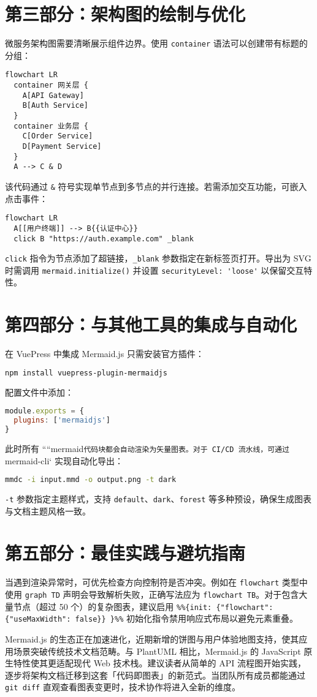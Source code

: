 \chapter{第三部分：架构图的绘制与优化}
微服务架构图需要清晰展示组件边界。使用 \verb!container! 语法可以创建带有标题的分组：\par
\begin{lstlisting}[language=mermaid]
flowchart LR
  container 网关层 {
    A[API Gateway]
    B[Auth Service]
  }
  container 业务层 {
    C[Order Service]
    D[Payment Service]
  }
  A --> C & D
\end{lstlisting}
该代码通过 \verb!&! 符号实现单节点到多节点的并行连接。若需添加交互功能，可嵌入点击事件：\par
\begin{lstlisting}[language=mermaid]
flowchart LR
  A[[用户终端]] --> B{{认证中心}}
  click B "https://auth.example.com" _blank
\end{lstlisting}
\verb!click! 指令为节点添加了超链接，\verb!_blank! 参数指定在新标签页打开。导出为 SVG 时需调用 \verb!mermaid.initialize()! 并设置 \verb!securityLevel: 'loose'! 以保留交互特性。\par
\chapter{第四部分：与其他工具的集成与自动化}
在 VuePress 中集成 Mermaid.js 只需安装官方插件：\par
\begin{lstlisting}[language=bash]
npm install vuepress-plugin-mermaidjs
\end{lstlisting}
配置文件中添加：\par
\begin{lstlisting}[language=javascript]
module.exports = {
  plugins: ['mermaidjs']
}
\end{lstlisting}
此时所有 ````mermaid\verb!代码块都会自动渲染为矢量图表。对于 CI/CD 流水线，可通过!mermaid-cli` 实现自动化导出：\par
\begin{lstlisting}[language=bash]
mmdc -i input.mmd -o output.png -t dark
\end{lstlisting}
\verb!-t! 参数指定主题样式，支持 \verb!default!、\verb!dark!、\verb!forest! 等多种预设，确保生成图表与文档主题风格一致。\par
\chapter{第五部分：最佳实践与避坑指南}
当遇到渲染异常时，可优先检查方向控制符是否冲突。例如在 \verb!flowchart! 类型中使用 \verb!graph TD! 声明会导致解析失败，正确写法应为 \verb!flowchart TB!。对于包含大量节点（超过 50 个）的复杂图表，建议启用 \verb!%%{init: {"flowchart": {"useMaxWidth": false}} }%%! 初始化指令禁用响应式布局以避免元素重叠。\par
Mermaid.js 的生态正在加速进化，近期新增的饼图与用户体验地图支持，使其应用场景突破传统技术文档范畴。与 PlantUML 相比，Mermaid.js 的 JavaScript 原生特性使其更适配现代 Web 技术栈。建议读者从简单的 API 流程图开始实践，逐步将架构文档迁移到这套「代码即图表」的新范式。当团队所有成员都能通过 \verb!git diff! 直观查看图表变更时，技术协作将进入全新的维度。\par
